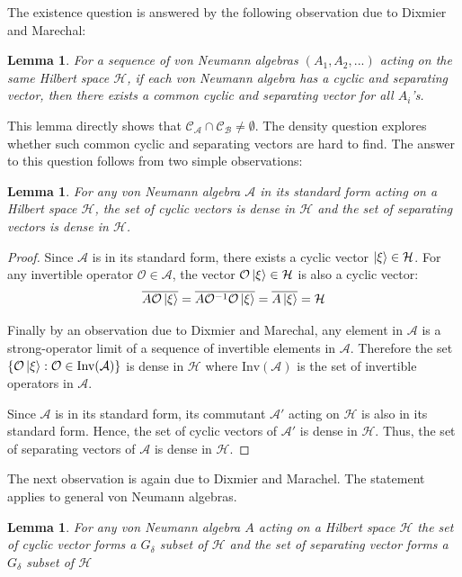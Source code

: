 \documentclass[a4paper,11pt]{article}
\newtheorem{lemma}[theorem]{Lemma}
\theoremstyle{definition}
\begin{document}
The existence question is answered by the following observation due to Dixmier and Marechal\cite{dixmiermarechal}:
\begin{lemma}
    For a sequence of von Neumann algebras $(A_1,A_2,...)$ acting on the same Hilbert space $\mathcal{H}$, if each von Neumann algebra has a cyclic and separating vector, then there exists a common cyclic and separating vector for all $A_i$'s. 
\end{lemma}
This lemma directly shows that $\mathcal{C}_\mathcal{A}\cap\mathcal{C}_\mathcal{B} \neq \emptyset$. The density question explores whether such common cyclic and separating vectors are hard to find. The answer to this question follows from two simple observations:
\begin{lemma}
    For any von Neumann algebra $\mathcal{A}$ in its standard form acting on a Hilbert space $\mathcal{H}$, the set of cyclic vectors is dense in $\mathcal{H}$ and the set of separating vectors is dense in $\mathcal{H}$.
\end{lemma}
\begin{proof}
    Since $\mathcal{A}$ is in its standard form, there exists a cyclic vector $\ket{\xi}\in\mathcal{H}$. For any invertible operator $\mathcal{O}\in\mathcal{A}$, the vector $\mathcal{O}\ket{\xi}\in\mathcal{H}$ is also a cyclic vector:
    \begin{equation}
        \overline{A\mathcal{O}\ket{\xi}} = \overline{A\mathcal{O}^{-1}\mathcal{O}\ket{\xi}} = \overline{A\ket{\xi}} = \mathcal{H}
    \end{equation}
    
    Finally by an observation due to Dixmier and Marechal\cite{dixmiermarechal}, any element in $\mathcal{A}$ is a strong-operator limit of a sequence of invertible elements in $\mathcal{A}$. Therefore the set $\{\mathcal{O}\ket{\xi}: \mathcal{O}\in \text{Inv}(\mathcal{A})\}$ is dense in $\mathcal{H}$ where $\text{Inv}(\mathcal{A})$ is the set of invertible operators in $\mathcal{A}$.

    Since $\mathcal{A}$ is in its standard form, its commutant $\mathcal{A}'$ acting on $\mathcal{H}$ is also in its standard form. Hence, the set of cyclic vectors of $\mathcal{A}'$ is dense in $\mathcal{H}$. Thus, the set of separating vectors of $\mathcal{A}$ is dense in $\mathcal{H}$.
\end{proof}
The next observation is again due to Dixmier and Marachel\cite{dixmiermarechal}. The statement applies to general von Neumann algebras.
\begin{lemma}
    For any von Neumann algebra $A$ acting on a Hilbert space $\mathcal{H}$ the set of cyclic vector forms a $G_\delta$ subset of $\mathcal{H}$ and the set of separating vector forms a $G_\delta$ subset of $\mathcal{H}$
\end{lemma}
\end{document}
